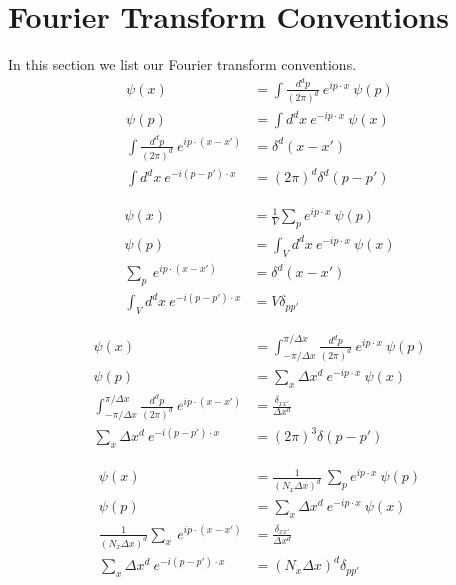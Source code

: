 \section{Fourier Transform Conventions}\label{sec:ft-conv}
In this section we list our Fourier transform conventions. \\

\begin{align}
\psi(x) & = \int \frac{d^d p}{(2 \pi)^d} ~ e^{i p\cdot x} ~ \psi(p) \\
\psi(p) & = \int d^d x ~ e^{-i p\cdot x} ~ \psi(x) \\
\int \frac{d^d p}{(2 \pi)^d} ~ e^{i p\cdot (x-x')} & = \delta^d(x-x') \\
\int d^d x ~ e^{-i (p - p') \cdot x} & = (2\pi)^d\delta^d(p-p') 
\end{align}

\begin{align}
\psi(x) & = \frac{1}{V} \sum_p e^{i p\cdot x} ~ \psi(p) \\
\psi(p) & = \int_V d^d x ~ e^{-i p\cdot x} ~ \psi(x) \\
\sum_p ~ e^{i p\cdot (x-x')} & = \delta^d(x-x') \\
\int_V d^d x ~ e^{-i (p - p') \cdot x} & = V \delta_{p p'} 
\end{align}

\begin{align}
\psi(x) & =  \int_{-\pi/\Delta x}^{\pi/\Delta x} \frac{d^d p}{(2\pi)^d} ~ e^{i p\cdot x} ~ \psi(p) \\
\psi(p) & = \sum_x \Delta x^d ~ e^{-i p\cdot x} ~ \psi(x) \\
\int_{-\pi/\Delta x}^{\pi/\Delta x} \frac{d^d p}{(2\pi)^d} ~ e^{i p\cdot (x-x')} & = \frac{\delta_{x x'}}{\Delta x^d} \\
\sum_x \Delta x^d ~ e^{-i (p - p') \cdot x} & = (2\pi)^3 \delta(p - p') 
\end{align}

\begin{align}
\psi(x) & = \frac{1}{(N_x \Delta x)^d} ~ \sum_p e^{i p\cdot x} ~ \psi(p) \\
\psi(p) & = \sum_x \Delta x^d ~ e^{-i p\cdot x} ~ \psi(x) \\
\frac{1}{(N_x \Delta x)^d}\sum_x ~ e^{i p \cdot (x -x')} & = \frac{ \delta_{x x'}}{\Delta x^d} \\
\sum_x \Delta x^d ~ e^{-i (p-p')\cdot x} & = (N_x \Delta x)^d \delta_{p p'} 
\end{align}
